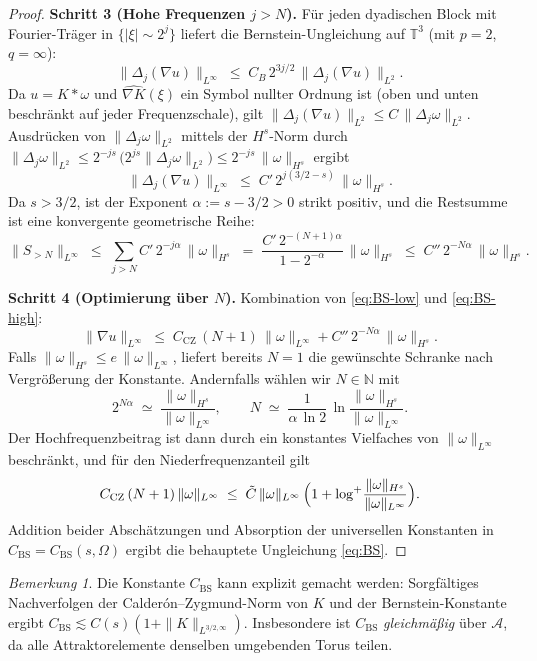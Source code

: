 \documentclass[12pt,a4paper]{article}
\theoremstyle{definition}
\theoremstyle{plain}
\theoremstyle{remark}
\newtheorem{remark}[definition]{Bemerkung}
\begin{document}
\begin{proof}
\medskip
\noindent\textbf{Schritt 3 (Hohe Frequenzen $j > N$).}
Für jeden dyadischen Block mit Fourier-Träger in $\{|\xi| \sim 2^j\}$ liefert die
Bernstein-Ungleichung auf $\mathbb{T}^3$ (mit $p=2$, $q=\infty$):
\[
    \|\Delta_j(\nabla u)\|_{L^\infty}
    \;\le\; C_B\,2^{3j/2}\,\|\Delta_j(\nabla u)\|_{L^2}.
\]
Da $u = K * \omega$ und $\widehat{\nabla K}(\xi)$ ein Symbol nullter Ordnung ist
(oben und unten beschränkt auf jeder Frequenzschale), gilt
$\|\Delta_j(\nabla u)\|_{L^2} \le C\,\|\Delta_j \omega\|_{L^2}$.
Ausdrücken von $\|\Delta_j \omega\|_{L^2}$ mittels der $H^s$-Norm
durch $\|\Delta_j\omega\|_{L^2} \le 2^{-js}\,\bigl(2^{js}\|\Delta_j\omega\|_{L^2}\bigr)
\le 2^{-js}\,\|\omega\|_{H^s}$ ergibt
\[
    \|\Delta_j(\nabla u)\|_{L^\infty}
    \;\le\; C'\,2^{j(3/2-s)}\,\|\omega\|_{H^s}.
\]
Da $s > 3/2$, ist der Exponent $\alpha := s - 3/2 > 0$ strikt positiv,
und die Restsumme ist eine konvergente geometrische Reihe:
\begin{equation}\label{eq:BS-high}
    \|S_{>N}\|_{L^\infty}
    \;\le\; \sum_{j>N} C'\,2^{-j\alpha}\,\|\omega\|_{H^s}
    \;=\; \frac{C'\,2^{-(N+1)\alpha}}{1 - 2^{-\alpha}}\,\|\omega\|_{H^s}
    \;\le\; C''\,2^{-N\alpha}\,\|\omega\|_{H^s}.
\end{equation}

\medskip
\noindent\textbf{Schritt 4 (Optimierung über $N$).}
Kombination von \eqref{eq:BS-low} und \eqref{eq:BS-high}:
\[
    \|\nabla u\|_{L^\infty}
    \;\le\; C_{\mathrm{CZ}}\,(N+1)\,\|\omega\|_{L^\infty}
          + C''\,2^{-N\alpha}\,\|\omega\|_{H^s}.
\]
Falls $\|\omega\|_{H^s}\le e\,\|\omega\|_{L^\infty}$, liefert bereits
$N=1$ die gewünschte Schranke nach Vergrößerung der Konstante. Andernfalls
wählen wir $N \in \mathbb{N}$ mit
\[
    2^{N\alpha} \;\simeq\; \frac{\|\omega\|_{H^s}}{\|\omega\|_{L^\infty}},
    \qquad
    N \;\simeq\; \frac{1}{\alpha\,\ln 2}\,
            \ln\!\frac{\|\omega\|_{H^s}}{\|\omega\|_{L^\infty}}.
\]
Der Hochfrequenzbeitrag ist dann durch ein konstantes Vielfaches von
$\|\omega\|_{L^\infty}$ beschränkt, und für den Niederfrequenzanteil gilt
\[
    C_{\mathrm{CZ}}\,(N+1)\,\|\omega\|_{L^\infty}
    \;\le\; \tilde C\,\|\omega\|_{L^\infty}\,
            \Bigl(1 + \log^+\!\frac{\|\omega\|_{H^s}}{\|\omega\|_{L^\infty}}\Bigr).
\]
Addition beider Abschätzungen und Absorption der universellen Konstanten in
$C_{\mathrm{BS}} = C_{\mathrm{BS}}(s,\Omega)$ ergibt die behauptete
Ungleichung \eqref{eq:BS}.
\end{proof}

\begin{remark}
Die Konstante $C_{\mathrm{BS}}$ kann explizit gemacht werden: Sorgfältiges Nachverfolgen der
Calder\'{o}n--Zygmund-Norm von $K$ und der Bernstein-Konstante ergibt
$C_{\mathrm{BS}} \lesssim C(s)(1 + \|K\|_{L^{3/2,\infty}})$. Insbesondere
ist $C_{\mathrm{BS}}$ \emph{gleichmäßig} über $\mathcal{A}$, da alle Attraktorelemente
denselben umgebenden Torus teilen.
\end{remark}
\end{document}
